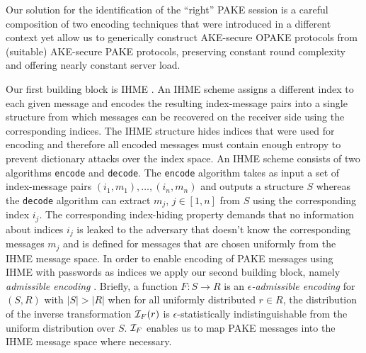Our solution for the identification of the ``right'' \ac{PAKE} session is a careful composition of two encoding techniques that were introduced in a different context yet allow us to generically construct \ac{AKE}-secure \ac{OPAKE} protocols from (suitable) \ac{AKE}-secure \ac{PAKE} protocols, preserving constant round complexity and offering nearly constant server load.

Our first building block is \ac{IHME} \cite{Manulis2010,Manulis2011}.
An \ac{IHME} scheme assigns a different index to each given message and encodes the resulting index-message pairs into a single structure from which messages can be recovered on the receiver side using the corresponding indices.
The \ac{IHME} structure hides indices that were used for encoding and therefore all encoded messages must contain enough entropy to prevent dictionary attacks over the index space.
An \ac{IHME} scheme consists of two algorithms \texttt{encode} and \texttt{decode}.
The \texttt{encode} algorithm takes as input a set of index-message pairs $(i_1, m_1),\ldots,(i_n, m_n)$ and outputs a structure $S$ whereas the \texttt{decode} algorithm can extract $m_j$, $j\in[1,n]$ from $S$ using the corresponding index $i_j$.
The corresponding index-hiding property demands that no information about indices $i_j$ is leaked to the adversary that doesn't know the corresponding messages $m_j$ and is defined for messages that are chosen uniformly from the \ac{IHME} message space.
In order to enable encoding of \ac{PAKE} messages using \ac{IHME} with passwords as indices we apply our second building block, namely \emph{admissible encoding} \cite{BonehF01,BrierCIMRT10,pseudorandomSignatures}.
Briefly, a function $F:S\rightarrow R$ is an \emph{$\epsilon$-admissible encoding} for $(S,R)$ with $|S|>|R|$ when for all uniformly distributed $r\in R$, the distribution of the inverse transformation $\mathcal{I}_F(r)$ is $\epsilon$-statistically indistinguishable from the uniform distribution over $S$.
$\mathcal{I}_F$ enables us to map \ac{PAKE} messages into the \ac{IHME} message space where necessary.

